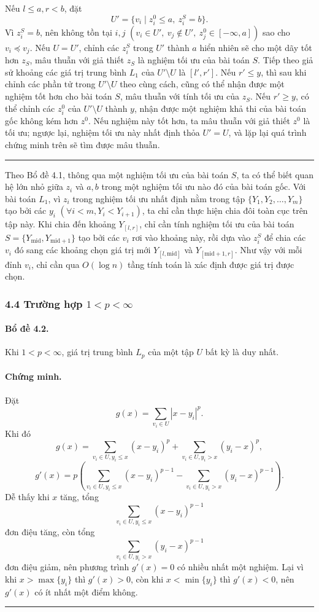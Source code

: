 \documentclass[11pt]{article}
\newcommand{\qedmark}{\hfill\rule{0.7ex}{0.7ex}}
\begin{document}
Nếu \(l\le a,r<b\), đặt
\[
  U'=\{v_i\mid z_i^0\le a,\ z_i^S=b\}.
\]
Vì \(z_i^S=b\), nên không tồn tại \(i,j\)
\((v_i\in U',\ v_j\notin U',\ z_j^0\in[-\infty,a])\) sao cho
\(v_i\preceq v_j\). Nếu \(U=U'\), chỉnh các \(z_i^S\) trong \(U'\) thành \(a\)
hiển nhiên sẽ cho một dãy tốt hơn \(z_S\), mâu thuẫn với giả thiết \(z_S\) là
nghiệm tối ưu của bài toán \(S\). Tiếp theo giả sử khoảng các giá trị trung bình
\(L_1\) của \(U'\setminus U\) là \([l',r']\). Nếu \(r'\le y\), thì sau khi chỉnh
các phần tử trong \(U'\setminus U\) theo cùng cách, cũng có thể nhận được một
nghiệm tốt hơn cho bài toán \(S\), mâu thuẫn với tính tối ưu của \(z_S\). Nếu
\(r'\ge y\), có thể chỉnh các \(z_i^0\) của \(U'\setminus U\) thành \(y\), nhận
được một nghiệm khả thi của bài toán gốc không kém hơn \(z^0\). Nếu nghiệm này
tốt hơn, ta mâu thuẫn với giả thiết \(z^0\) là tối ưu; ngược lại, nghiệm tối ưu
này nhất định thỏa \(U'=U\), và lặp lại quá trình chứng minh trên sẽ tìm được
mâu thuẫn. \qedmark

Theo Bổ đề 4.1, thông qua một nghiệm tối ưu của bài toán \(S\), ta có thể biết
quan hệ lớn nhỏ giữa \(z_i\) và \(a,b\) trong một nghiệm tối ưu nào đó của bài
toán gốc. Với bài toán \(L_1\), vì \(z_i\) trong nghiệm tối ưu nhất định nằm
trong tập \(\{Y_1,Y_2,\ldots,Y_m\}\) tạo bởi các \(y_i\)
\((\forall i<m,Y_i<Y_{i+1})\), ta chỉ cần thực hiện chia đôi toàn cục trên tập
này. Khi chia đến khoảng \(Y_{[l,r]}\), chỉ cần tính nghiệm tối ưu của bài toán
\(S=\{Y_{\mathrm{mid}},Y_{\mathrm{mid}+1}\}\) tạo bởi các \(v_i\) rơi vào khoảng
này, rồi dựa vào \(z_i^S\) để chia các \(v_i\) đó sang các khoảng chọn giá trị
mới \(Y_{[l,\mathrm{mid}]}\) và \(Y_{[\mathrm{mid}+1,r]}\). Như vậy với mỗi đỉnh
\(v_i\), chỉ cần qua \(O(\log n)\) tầng tính toán là xác định được giá trị được
chọn.

\subsubsection*{4.4 Trường hợp \(1<p<\infty\)}

\paragraph{Bổ đề 4.2.}
Khi \(1<p<\infty\), giá trị trung bình \(L_p\) của một tập \(U\) bất kỳ là duy
nhất.

\paragraph{Chứng minh.}
Đặt
\[
  g(x)=\sum_{v_i\in U}|x-y_i|^p.
\]
Khi đó
\[
  g(x)=\sum_{v_i\in U,y_i\le x}(x-y_i)^p
       +\sum_{v_i\in U,y_i>x}(y_i-x)^p,
\]
\[
  g'(x)=p\left(
       \sum_{v_i\in U,y_i\le x}(x-y_i)^{p-1}
       -\sum_{v_i\in U,y_i>x}(y_i-x)^{p-1}
       \right).
\]
Dễ thấy khi \(x\) tăng, tổng
\[
  \sum_{v_i\in U,y_i\le x}(x-y_i)^{p-1}
\]
đơn điệu tăng, còn tổng
\[
  \sum_{v_i\in U,y_i>x}(y_i-x)^{p-1}
\]
đơn điệu giảm, nên phương trình \(g'(x)=0\) có nhiều nhất một nghiệm. Lại vì
khi \(x>\max\{y_i\}\) thì \(g'(x)>0\), còn khi \(x<\min\{y_i\}\) thì
\(g'(x)<0\), nên \(g'(x)\) có ít nhất một điểm không. \qedmark
\end{document}
